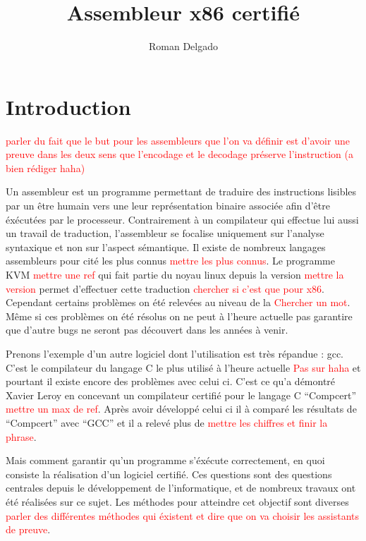 \documentclass {article}
\title{Assembleur x86 certifié}
\author{Roman Delgado}
\date{}
\theoremstyle{definition}
\theoremstyle{remark}
\newcommand{\todo}[1]{\textcolor{red}{#1}}
\begin{document}
\maketitle



\vfill
\setcounter{tocdepth}{2}
\tableofcontents
\vfill


\section{Introduction}

\todo{parler du fait que le but pour les assembleurs que l'on va définir est d'avoir une preuve dans les deux sens
  que l'encodage et le decodage préserve l'instruction (a bien rédiger haha)}

Un assembleur est un programme permettant de traduire des instructions lisibles par un être humain vers
une leur représentation binaire associée afin d'être éxécutées par le processeur. Contrairement à un compilateur
qui effectue lui aussi un travail de traduction, l'assembleur se focalise uniquement sur l'analyse syntaxique
et non sur l'aspect sémantique.
Il existe de nombreux langages
assembleurs pour cité les plus connus \todo{mettre les plus connus}.
Le programme KVM \todo{mettre une ref} qui fait partie du noyau linux depuis la version \todo{mettre la version}
permet d'effectuer cette traduction \todo{chercher si c'est que pour x86}.
Cependant certains problèmes on été relevées au niveau de la \todo{Chercher un mot}.
Même si ces problèmes on été résolus on ne peut à l'heure actuelle pas garantire que d'autre bugs ne seront pas
découvert dans les années à venir.

Prenons l'exemple d'un autre logiciel dont l'utilisation est très répandue : gcc. C'est le compilateur
du langage C le plus utilisé à l'heure actuelle \todo{Pas sur haha} et pourtant il existe encore des
problèmes avec celui ci. C'est ce qu'a démontré Xavier Leroy en concevant un compilateur certifié pour le langage C ``Compcert''
\todo{mettre un max de ref}. Après avoir développé celui ci il à comparé les résultats de ``Compcert'' avec ``GCC''
et il a relevé plus de \todo{mettre les chiffres et finir la phrase}.


Mais comment garantir qu'un programme s'éxécute correctement, en quoi consiste la réalisation d'un logiciel certifié.
Ces questions sont des questions centrales depuis le développement de l'informatique, et de nombreux travaux ont été
réalisées sur ce sujet. Les méthodes pour atteindre cet objectif sont diverses \todo{parler des différentes méthodes qui éxistent et dire
que on va choisir les assistants de preuve}.
\end{document}
